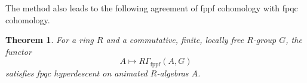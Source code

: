 \documentclass[11pt, reqno]{amsart}
\newcommand{\revise}[1]{{\color{Bittersweet}  
 #1}}					%
\renewcommand{\revise}[1]{#1}
\newcommand{\et}{\mathrm{\acute{e}t}}	%
\newcommand{\fppf}{\mathrm{fppf}}		%
\newcommand{\isomto}{\overset{\sim}{\longrightarrow}}
\newcommand{\wh}{\widehat}
\providecommand{\abs}[1]{\left\lvert#1\right\rvert}
\providecommand{\up}[1]{{\upshape(}#1{\upshape)}}
\providecommand{\uref}[1]{{\upshape\ref{#1}}}
\providecommand{\uS}{{\upshape\S}}
\providecommand{\f}[2]{\frac{#1}{#2}}
\providecommand{\uscolon}{{\upshape;} }
\newcommand{\x}{\text}
\newcommand{\rv}{\revise}
\providecommand{\qxq}[1]{\quad\text{#1}\quad}
\newcommand{\q}{\quad}
\newcommand{\tst}{\textstyle}
\newcommand{\be}{\begin{equation}}
\newcommand{\ee}{\end{equation}}
\numberwithin{equation}{numberingbase}
\theoremstyle{thms}
\newtheorem{theorem}[numberingbase]{Theorem}
\theoremstyle{claims}
\theoremstyle{defs}
\theoremstyle{thms}
\theoremstyle{defs}
\theoremstyle{subsection-tweak}
\theoremstyle{subsection-tweak}
\begin{document}





The method also leads to the following agreement of fppf cohomology with fpqc cohomology.


\begin{theorem}\label{thm:strongdescent} 
For a ring $R$ and a commutative, finite, locally free $R$-group $G$, the functor 
\[
A\mapsto R\Gamma_\fppf(A,G)
\]
satisfies fpqc hyperdescent on animated $R$-algebras $A$. %
\end{theorem}
\end{document}
